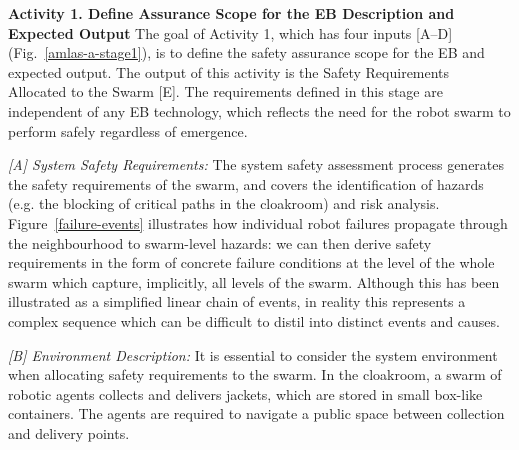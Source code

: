 \documentclass[runningheads]{llncs}
\begin{document}
\noindent\textbf{Activity 1. Define Assurance Scope for the EB Description and Expected Output}
The goal of Activity 1, which has four inputs [A--D] (Fig.~\ref{amlas-a-stage1}), is to define the safety assurance scope for the EB and expected output. 
The output of this activity is the Safety Requirements Allocated to the Swarm [E]. The requirements defined in this stage are independent of any EB technology, which reflects the need for the robot swarm to perform safely regardless of emergence. %

\emph{[A] System Safety Requirements:}
The system safety assessment process generates the safety requirements of the swarm, and covers the identification of hazards (e.g. the blocking of critical paths in the cloakroom) and risk analysis.
Figure~\ref{failure-events} illustrates how individual robot failures propagate through the neighbourhood to swarm-level hazards: we can then derive safety requirements in the form of concrete failure conditions at the level of the whole swarm which capture, implicitly, all levels of the swarm. 
Although this has been illustrated as a simplified linear chain of events, in reality this represents a complex sequence which can be difficult to distil into distinct events and causes. 

\emph{[B] Environment Description:}
It is essential to consider the system environment when allocating safety requirements to the swarm. 
In the cloakroom, a swarm of robotic agents collects and delivers jackets, which are stored in small box-like containers. 
The agents are required to navigate a public space between collection and delivery points. 
\end{document}
